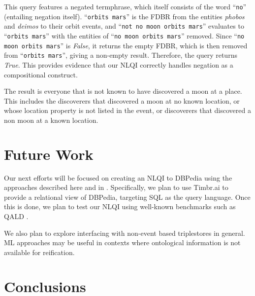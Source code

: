\documentclass[../main.tex]{subfiles}
\begin{document}
\begin{refsection}
\examplespacing


\examplespacing

\noindent This query features a negated termphrase, which itself consists of the word ``\texttt{no}'' (entailing negation itself). ``\texttt{orbits mars}'' is the FDBR from the entities \textit{phobos} and \textit{deimos} to their orbit events, and ``\texttt{not no moon orbits mars}'' evaluates to ``\texttt{orbits mars}'' with the entities of ``\texttt{no moon orbits mars}'' removed.  Since ``\texttt{no moon orbits mars}'' is \textit{False}, it returns the empty FDBR, which is then removed from ``\texttt{orbits mars}'', giving a non-empty result.  Therefore, the query returns \textit{True}. This provides evidence that our NLQI correctly handles negation as a compositional construct.

\examplespacing


\examplespacing

\noindent The result is everyone that is not known to have discovered a moon at a place.  This includes the discoverers that discovered a moon at no known location, or whose location property is not listed in the event, or discoverers that discovered a non moon at a known location.

\section{Future Work}
\label{webist2020conf:future}

\noindent Our next efforts will be focused on creating an NLQI to DBPedia using the approaches
described here and in \cite{peelar2020webistjournal}.  Specifically, we plan to use Timbr.ai \cite{timbr} to provide a relational view of DBPedia, targeting SQL as the query language.
Once this is done, we plan to test our NLQI using well-known benchmarks such as QALD \cite{qald9}.

We also plan to explore interfacing with non-event based triplestores in general.  ML approaches may be useful in contexts where ontological information is not available for reification.


\section{Conclusions}
\label{webist2020conf:conclusion}


\end{refsection}
\end{document}

